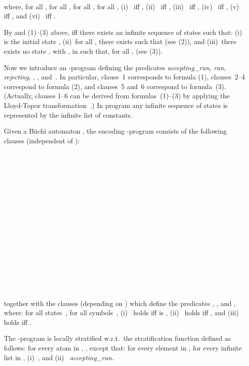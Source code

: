 \documentclass[english]{tlp}
\newcommand{\Mathit}[1]{\mbox{\it #1}}
\begin{document}
\begin{example}
\smallskip
\noindent{}~

\smallskip
\noindent where, for all , for all , for all
, for all , 
(i)~ iff , 
(ii)~ iff , 
(iii)~ iff , 
(iv)~ iff 
     , 
(v)~ iff , and
(vi)~ iff .

By  and (1)--(3) above,  iff there
exists an infinite sequence  of
states such that: (i)~ is the initial state , (ii)~for 
all , there exists  such that 
 (see (2)), and (iii)~there exists no state 
, with , in   such that, for all ,  (see (3)).

Now we introduce an 
-program  defining the predicates
{\it {accepting\_run}}, {\it run}, {\it{rejecting}},
, , and~.
In particular, clause~1 corresponds to formula (1),
clauses~2--4 correspond to formula (2), and
clauses~5 and~6 correspond to formula~(3). 
(Actually, 
clauses 1--6 can be derived from formulas~(1)--(3)
by applying the Lloyd-Topor transformation~\cite{Llo87}.)
In program
 any infinite sequence  of states is
represented by the infinite list
 of constants.

Given a B\"{u}chi automaton , the encoding -program
 consists of the following clauses (independent of
):

\smallskip

~

~

~


~

~

~


~


~



~

\smallskip

\noindent together with the clauses (depending on )
which define the predicates , , and
, where: for all states~, for all
symbols~, (i)~ holds iff
 is , (ii)~ holds iff , and (iii)~
holds iff .
 
The -program  is locally stratified w.r.t.~the
stratification function  defined as follows: for every atom
 in , , except that: for every
element  in \mbox{,} for every infinite list
 in ,
(i)~, and (ii)~ {\Mathit{ac\-cept\-ing\_run}}.


\end{example}
\end{document}
